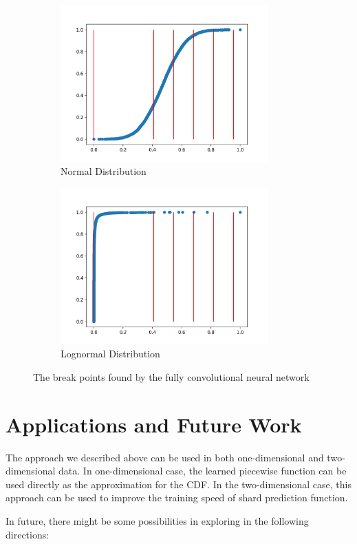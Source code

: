 \begin{figure}[t]
\begin{subfigure}[b]{0.5\textwidth}\includegraphics[width=8cm]{graphs/fcn/normal}
\caption{Normal Distribution}
\end{subfigure}	
\hfill
\begin{subfigure}[b]{0.5\textwidth}\includegraphics[width=8cm]{graphs/fcn/lognormal}
\caption{Lognormal Distribution}
\end{subfigure}
\caption{The break points found by the fully convolutional neural network}
\label{fig:fcn_betas_found}
\end{figure}

\section{Applications and Future Work}

The approach we described above can be used in both one-dimensional and two-dimensional data. In one-dimensional case, the learned piecewise function can be used directly as the approximation for the CDF. In the two-dimensional case, this approach can be used to improve the training speed of shard prediction function.

In future, there might be some possibilities in exploring in the following directions:

